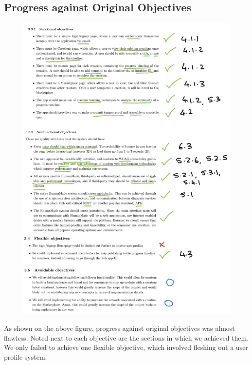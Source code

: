 \documentclass[12pt,a4paper]{article}
\begin{document}
\subsection{Progress against Original Objectives}
\begin{figure}[H]
    \centering
    \includegraphics[scale=0.7]{objectives.png}
\end{figure}
As shown on the above figure, progress against original objectives was almost flawless. Noted next to each objective are the sections in which we achieved them. We only failed to achieve one flexible objective, which involved fleshing out a user profile system.

\newpage

\end{document}
